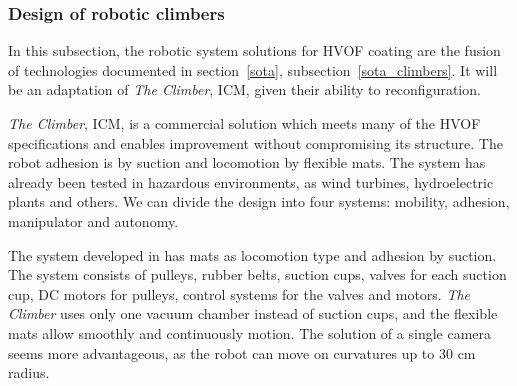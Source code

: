 \subsubsection{Design of robotic climbers}\label{proj_climbers}
In this subsection, the robotic system solutions for HVOF coating are the fusion
of technologies documented in section~\ref{sota},
subsection~\ref{sota_climbers}. It will be an adaptation of \emph{The Climber},
ICM, given their ability to reconfiguration.


\emph{The Climber}, ICM, is a commercial solution which meets many
of the HVOF specifications and enables improvement without compromising its
structure. The robot adhesion is by suction and locomotion by flexible mats.
The system has already been tested in hazardous environments, as wind turbines,
hydroelectric plants and others. We can divide the design into four systems:
mobility, adhesion, manipulator and autonomy.


The system developed in \cite{kim2008development} has mats as locomotion type
and adhesion by suction. The system consists of pulleys, rubber belts, suction
cups, valves for each suction cup, DC motors for pulleys, control systems for
the valves and motors. \emph{The Climber} uses only one vacuum chamber instead
of suction cups, and the flexible mats allow smoothly and continuously motion.
The solution of a single camera seems more advantageous, as the robot can
move on curvatures up to 30 cm radius.



